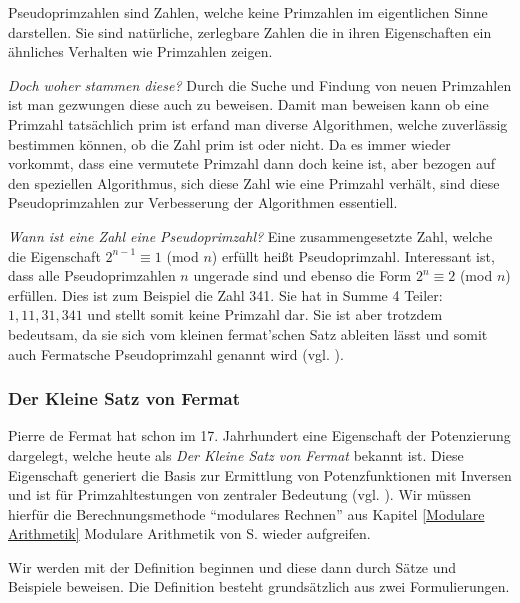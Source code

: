 \documentclass[12pt,a4paper]{article}
\theoremstyle{definition}
\begin{document}
Pseudoprimzahlen sind Zahlen, welche keine Primzahlen im eigentlichen Sinne darstellen.
Sie sind natürliche, zerlegbare Zahlen die in ihren Eigenschaften ein ähnliches Verhalten wie Primzahlen zeigen.

\textit{Doch woher stammen diese?}\newline
Durch die Suche und Findung von neuen Primzahlen ist man gezwungen diese auch zu beweisen.
Damit man beweisen kann ob eine Primzahl tatsächlich prim ist erfand man diverse Algorithmen, welche zuverlässig bestimmen können, ob die Zahl prim ist oder nicht.
Da es immer wieder vorkommt, dass eine vermutete Primzahl dann doch keine ist, aber bezogen auf den speziellen Algorithmus, sich diese Zahl wie eine Primzahl verhält, sind diese Pseudoprimzahlen zur Verbesserung der Algorithmen essentiell.

\textit{Wann ist eine Zahl eine Pseudoprimzahl?}\newline
Eine zusammengesetzte Zahl, welche die Eigenschaft $2^{n-1}\equiv 1$ (mod $n$) erfüllt heißt Pseudoprimzahl.
Interessant ist, dass alle Pseudoprimzahlen $n$ ungerade sind und ebenso die Form $2^n \equiv 2$ (mod $n$) erfüllen. 
Dies ist zum Beispiel die Zahl 341.
Sie hat in Summe 4 Teiler: $1, 11, 31, 341$ und stellt somit keine Primzahl dar.
Sie ist aber trotzdem bedeutsam, da sie sich vom kleinen fermat'schen Satz ableiten lässt und somit auch Fermatsche Pseudoprimzahl genannt wird (vgl. \cite[91]{Ribenboim2006}).

\subsubsection{Der Kleine Satz von Fermat}\label{Der Kleine Satz von Fermat}
Pierre de Fermat hat schon im 17. Jahrhundert eine Eigenschaft der Potenzierung dargelegt, welche heute als \textit{Der Kleine Satz von Fermat} bekannt ist. 
Diese Eigenschaft generiert die Basis zur Ermittlung von Potenzfunktionen mit Inversen und ist für Primzahltestungen von zentraler Bedeutung (vgl. \cite[303]{Meinel2015}).
Wir müssen hierfür die Berechnungsmethode “modulares Rechnen” aus Kapitel \ref{Modulare Arithmetik} Modulare Arithmetik von S. \pageref{Modulare Arithmetik} wieder aufgreifen.

Wir werden mit der Definition beginnen und diese dann durch Sätze und Beispiele beweisen.
Die Definition besteht grundsätzlich aus zwei Formulierungen.
\end{document}
